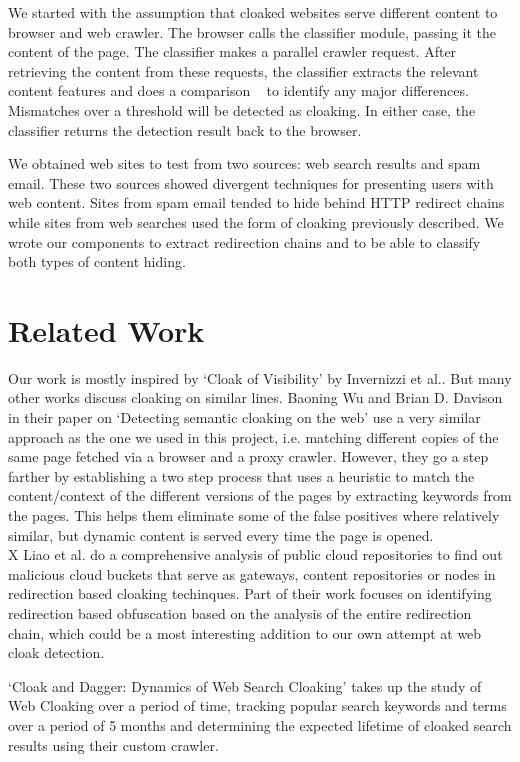 \documentclass[letterpaper,twocolumn,10pt]{article}
\begin{document}
We started with the assumption that cloaked websites serve different content to browser and web crawler.  The browser calls the classifier module, passing it the content of the page.  The classifier makes a parallel crawler request. After retrieving the content from these requests, the classifier extracts the relevant content features and does a comparison ~\cite{cloak} to identify any major differences.  Mismatches over a threshold will be detected as cloaking.  In either case, the classifier returns the detection result back to the browser.

We obtained web sites to test from two sources: web search results and spam email.  These two sources showed divergent techniques for presenting users with web content.  Sites from spam email tended to hide behind HTTP redirect chains while sites from web searches used the form of cloaking previously described.  We wrote our components to extract redirection chains and to be able to classify both types of content hiding.

\section{Related Work}
Our work is mostly inspired by `Cloak of Visibility' by Invernizzi et al.\cite{cloak}. But many other works discuss cloaking on similar lines. Baoning Wu and Brian D. Davison in their paper on `Detecting semantic cloaking on the web'\cite{Wu:2006:DSC:1135777.1135901} use a very similar approach as the one we used in this project, i.e. matching different copies of the same page fetched via a browser and a proxy crawler. However, they go a step farther by establishing a two step process that uses a heuristic to match the content/context of the different versions of the pages by extracting keywords from the pages. This helps them eliminate some of the false positives where relatively similar, but dynamic content is served every time the page is opened.\\
X Liao et al.\cite{liao2016lurking} do a comprehensive analysis of public cloud repositories to find out malicious cloud buckets that serve as gateways, content repositories or nodes in redirection based cloaking techinques. Part of their work focuses on identifying redirection based obfuscation based on the analysis of the entire redirection chain, which could be a most interesting addition to our own attempt at web cloak detection.

`Cloak and Dagger: Dynamics of Web Search Cloaking'\cite{Wang:2011:CDD:2046707.2046763} takes up the study of Web Cloaking over a period of time, tracking popular search keywords and terms over a period of 5 months and determining the expected lifetime of cloaked search results using their custom crawler.
\end{document}
